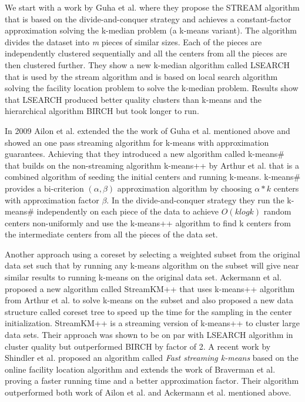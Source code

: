 We start with a work by Guha et al. \citep{Guha:2003} where they propose the STREAM algorithm that is based on the divide-and-conquer strategy and achieves a constant-factor approximation solving the k-median problem (a k-means variant). The algorithm divides the dataset into \textit{m} pieces of similar sizes. Each of the pieces are independently clustered sequentially and all the centers from all the pieces are then clustered further. They show a new k-median algorithm called LSEARCH that is used by the stream algorithm and is based on local search algorithm solving the facility location problem \citep{Charikar:1999} to solve the k-median problem. Results show that LSEARCH produced better quality clusters than k-means and the hierarchical algorithm BIRCH \citep{Zhang:1996} but took longer to run.

In 2009 Ailon et al. \citep{Ailon:2009} extended the the work of Guha et al. mentioned above and showed an one pass streaming algorithm for k-means with approximation guarantees. Achieving that they introduced a new algorithm called k-means\# that builds on the non-streaming algorithm k-means++ by Arthur et al. \citep{Arthur:2007} that is a combined algorithm of seeding the initial centers and running k-means. k-means\# provides a bi-criterion $ (\alpha,\beta) $ approximation algorithm by choosing $\alpha * k $ centers with approximation factor $\beta$. In the divide-and-conquer strategy they run the k-means\# independently on each piece of the data to achieve $O(k log k)$ random centers non-uniformly and use the k-means++ algorithm to find k centers from the intermediate centers from all the pieces of the data set. 

Another approach using a coreset by selecting a weighted subset from the original data set such that by running any k-means algorithm on the subset will give near similar results to running k-means on the original data set. Ackermann et al. \citep{Ackermann:2010} proposed a new algorithm called StreamKM++ that uses k-means++ algorithm from Arthur et al. \citep{Arthur:2007} to solve k-means on the subset and also proposed a new data structure called coreset tree to speed up the time for the sampling in the center initialization. StreamKM++ is a streaming version of k-means++ to cluster large data sets. Their approach was shown to be on par with LSEARCH algorithm in cluster quality but outperformed BIRCH by factor of 2. A recent work by Shindler et al. \citep{Shindler:2011} proposed an algorithm called \textit{Fast streaming k-means} based on the online facility location algorithm \citep{Meyerson:2001} and extends the work of Braverman et al. \citep{Braverman:2011} proving a faster running time and a better approximation factor. Their algorithm outperformed both work of Ailon et al. \citep{Ailon:2009} and Ackermann et al. \citep{Ackermann:2010} mentioned above.  

